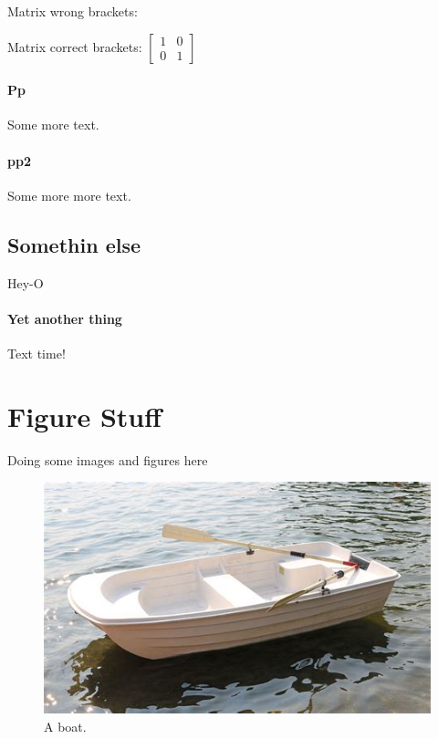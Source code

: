 \documentclass{article}
\begin{document}
      \noindent
      Matrix wrong brackets:
      \begin{equation*}
      [
      \begin{matrix}
        1 & 0 \\
        0 & 1
      \end{matrix}
      ]
      \end{equation*}

      \noindent
      Matrix correct brackets:
      $
      \left[
      \begin{matrix}
        1 & 0 \\
        0 & 1
      \end{matrix}
      \right]
      $

    \paragraph{Pp}
      Some more text.

    \paragraph{pp2}
      Some more more text.

    \subsection{Somethin else}
      Hey-O

    \paragraph{Yet another thing}
      Text time!

  \section{Figure Stuff}
    Doing some images and figures here

    \begin{figure}[h!]
      \includegraphics[width=\linewidth]{boat.jpeg}
      \caption{A boat.}
      \label{fig:boat1}
    \end{figure}
\end{document}
